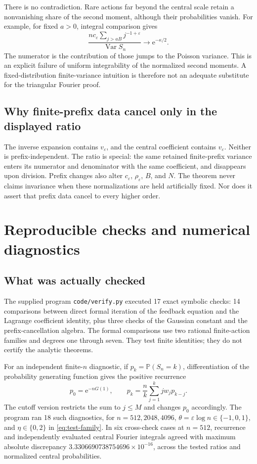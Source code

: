 \documentclass[11pt,a4paper]{article}
\numberwithin{equation}{section}
\theoremstyle{definition}
\theoremstyle{remark}
\newcommand{\eps}{\varepsilon}
\newcommand{\Pp}{\mathbb P}
\newcommand{\ee}{\mathrm e}
\DeclareMathOperator{\Var}{Var}
\begin{document}
There is no contradiction. Rare actions far beyond the central scale retain
a nonvanishing share of the second moment, although their probabilities
vanish. For example, for fixed \(a>0\), integral comparison gives
\[
 \frac{nc_{\eps}\sum_{j>aB}j^{-1+\eps}}{\Var S_n}
 \longrightarrow\ee^{-\kappa/2}.
\]
The numerator is the contribution of those jumps to the Poisson variance.
This is an explicit failure of uniform integrability of the normalized
second moments. A fixed-distribution finite-variance intuition is therefore
not an adequate substitute for the triangular Fourier proof.

\subsection{Why finite-prefix data cancel only in the displayed ratio}
The inverse expansion contains \(v_{\eps}\), and the central coefficient
contains \(v_{\eps}\). Neither is prefix-independent. The ratio is special:
the same retained finite-prefix variance enters its numerator and denominator
with the same coefficient, and disappears upon division. Prefix changes also
alter \(c_{\eps}\), \(\rho_{\eps}\), \(B\), and \(N\). The theorem never
claims invariance when these normalizations are held artificially fixed.
Nor does it assert that prefix data cancel to every higher order.

\section{Reproducible checks and numerical diagnostics}
\label{sec:checks}

\subsection{What was actually checked}
The supplied program \texttt{code/verify.py} executed 17 exact symbolic checks:
14 comparisons between direct formal iteration of the feedback equation and
the Lagrange coefficient identity, plus three checks of the Gaussian constant
and the prefix-cancellation algebra. The formal comparisons use two rational
finite-action families and degrees one through seven. They test finite
identities; they do not certify the analytic theorems.

For an independent finite-\(n\) diagnostic, if
\(p_k=\Pp(S_n=k)\), differentiation of the probability generating function
gives the positive recurrence
\begin{equation}
 p_0=\ee^{-nG(1)},\qquad
 p_k=\frac nk\sum_{j=1}^k jw_jp_{k-j}.
 \label{eq:prob-recurrence}
\end{equation}
The cutoff version restricts the sum to \(j\le M\) and changes \(p_0\)
accordingly. The program ran 18 such diagnostics, for
\(n=512,2048,4096\), \(\theta=\eps\log n\in\{-1,0,1\}\), and
\(\eta\in\{0,2\}\) in \eqref{eq:test-family}. In six cross-check cases at
\(n=512\), recurrence and independently evaluated central Fourier integrals
agreed with maximum absolute discrepancy
\(3.3306690738754696\times10^{-16}\), across the tested ratios and normalized
central probabilities.
\end{document}
